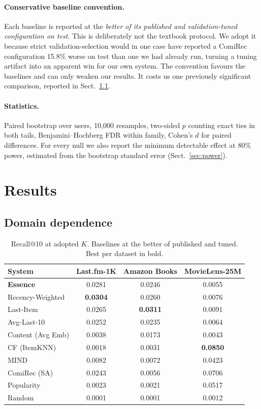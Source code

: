 \documentclass[runningheads]{llncs}
\begin{document}
\paragraph{Conservative baseline convention.} Each baseline is reported at the
\emph{better of its published and validation-tuned configuration on test}. This is
deliberately not the textbook protocol. We adopt it because strict validation-selection
would in one case have reported a ComiRec configuration 15.8\% worse on test than one we
had already run, turning a tuning artifact into an apparent win for our own system. The
convention favours the baselines and can only weaken our results. It costs us one
previously significant comparison, reported in Sect.~\ref{sec:domain}.

\paragraph{Statistics.} Paired bootstrap over users, 10{,}000 resamples, two-sided
$p$ counting exact ties in both tails, Benjamini--Hochberg FDR within family, Cohen's $d$
for paired differences. For every null we also report the minimum detectable effect at
80\% power, estimated from the bootstrap standard error (Sect.~\ref{sec:power}).

\section{Results}

\subsection{Domain dependence}\label{sec:domain}

\begin{table}[tb]
\caption{Recall@10 at adopted $K$. Baselines at the better of published and tuned.
Best per dataset in bold.}\label{tab:main}
\centering
\footnotesize
\begin{tabular}{@{}lccc@{}}
\toprule
System & Last.fm-1K & Amazon Books & MovieLens-25M \\
\midrule
\textbf{Essence} & 0.0281 & 0.0246 & 0.0055 \\
Recency-Weighted & \textbf{0.0304} & 0.0260 & 0.0076 \\
Last-Item & 0.0265 & \textbf{0.0311} & 0.0091 \\
Avg-Last-10 & 0.0252 & 0.0235 & 0.0064 \\
Content (Avg Emb) & 0.0038 & 0.0173 & 0.0043 \\
CF (ItemKNN) & 0.0018 & 0.0031 & \textbf{0.0850} \\
MIND & 0.0082 & 0.0072 & 0.0423 \\
ComiRec (SA) & 0.0243 & 0.0056 & 0.0706 \\
Popularity & 0.0023 & 0.0021 & 0.0517 \\
Random & 0.0001 & 0.0001 & 0.0012 \\
\bottomrule
\end{tabular}
\end{table}
\end{document}

